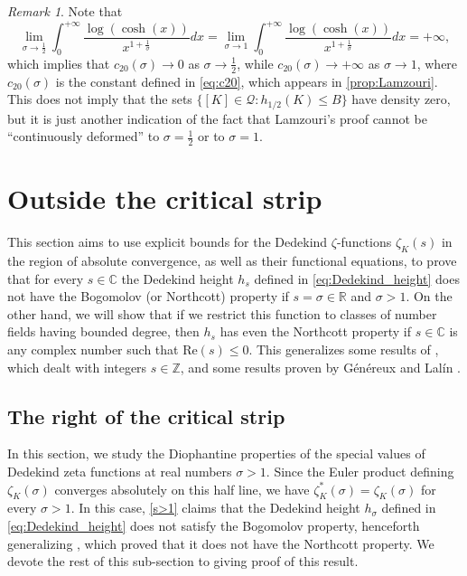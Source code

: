 \documentclass[10pt,a4paper]{amsart}
\theoremstyle{plain}
\theoremstyle{definition}
\theoremstyle{remark}
\newtheorem{remark}[theorem]{Remark}
\begin{document}
\begin{remark}
    Note that
    \[
        \lim_{\sigma \to \frac{1}{2}} \int_0^{+\infty} \frac{\log(\cosh(x))}{x^{1+\frac{1}{\sigma}}} dx = \lim_{\sigma \to 1} \int_0^{+\infty} \frac{\log(\cosh(x))}{x^{1+\frac{1}{\sigma}}} dx = +\infty,
    \]
    which implies that $c_{20}(\sigma) \to 0$ as $\sigma \to \frac{1}{2}$, while $c_{20}(\sigma) \to +\infty$ as $\sigma \to 1$, where $c_{20}(\sigma)$ is the constant defined in \eqref{eq:c20}, which appears in \cref{prop:Lamzouri}. This does not imply that the sets $\{[K] \in \mathcal{Q} \colon h_{1/2}(K) \leq B \}$ have density zero,
    but it is just another indication of the fact that Lamzouri's proof cannot be ``continuously deformed'' to $\sigma = \frac{1}{2}$ or to $\sigma = 1$.
\end{remark}


    \section{Outside the critical strip}
    \label{sec:critical_right}
    
    This section aims to use explicit bounds for the Dedekind $\zeta$-functions $\zeta_K(s)$ in the region of absolute convergence, as well as their functional equations, to prove that for every $s \in \mathbb{C}$ the Dedekind height $h_s$ defined in \eqref{eq:Dedekind_height} does not have the Bogomolov (or Northcott) property if $s = \sigma \in \mathbb{R}$ and $\sigma > 1$. On the other hand, we will show that if we restrict this function to classes of number fields having bounded degree, then $h_s$ has even the Northcott property if $s \in \mathbb{C}$ is any complex number such that $\mathrm{Re}(s) \leq 0$. This generalizes some results of \cite{Pazuki_Pengo_2024}, which dealt with integers $s \in \mathbb{Z}$, and some results proven by Généreux and Lalín \cite{GeLa24}.

    \subsection{The right of the critical strip}\label{bigger 1}

    In this section, we study the Diophantine properties of the special values of Dedekind zeta functions at real numbers $\sigma > 1$. Since the Euler product defining $\zeta_K(\sigma)$ converges absolutely on this half line, we have $\zeta_K^\ast(\sigma) = \zeta_K(\sigma)$ for every $\sigma > 1$. In this case, \cref{s>1} claims that the Dedekind height $h_\sigma$ defined in \eqref{eq:Dedekind_height} does not satisfy the Bogomolov property, henceforth generalizing \cite[Theorem~3.2]{GeLa24}, which proved that it does not have the Northcott property. We devote the rest of this sub-section to giving proof of this result.
    
\end{document}
